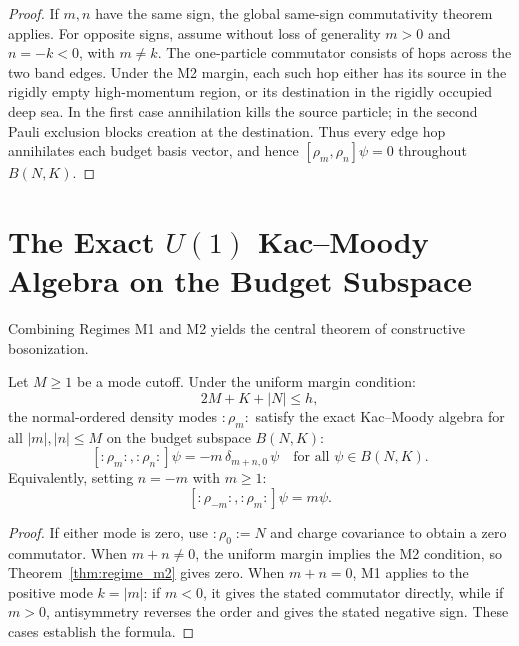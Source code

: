 \begin{proof}
If $m,n$ have the same sign, the global same-sign commutativity theorem applies. For opposite signs, assume without loss of generality $m>0$ and $n=-k<0$, with $m\ne k$. The one-particle commutator consists of hops across the two band edges. Under the M2 margin, each such hop either has its source in the rigidly empty high-momentum region, or its destination in the rigidly occupied deep sea. In the first case annihilation kills the source particle; in the second Pauli exclusion blocks creation at the destination. Thus every edge hop annihilates each budget basis vector, and hence $[\rho_m,\rho_n]\psi=0$ throughout $B(N,K)$.
\end{proof}

\section[The Exact U(1) Kac--Moody Algebra on the Budget Subspace]{The Exact $U(1)$ Kac--Moody Algebra on the Budget Subspace}

Combining Regimes M1 and M2 yields the central theorem of constructive bosonization.

\begin{theorem}
\label{thm:kac_moody}
Let $M \ge 1$ be a mode cutoff. Under the uniform margin condition:
\begin{equation}
2M + K + |N| \le h,
\end{equation}
the normal-ordered density modes $:\!\rho_m\!:$ satisfy the exact Kac--Moody algebra for all $|m|, |n| \le M$ on the budget subspace $B(N, K)$:
\begin{equation}
\left[ :\!\rho_m\!:, :\!\rho_n\!: \right] \psi = -m\, \delta_{m+n, 0}\, \psi \quad \text{for all } \psi \in B(N, K).
\end{equation}
Equivalently, setting $n = -m$ with $m \ge 1$:
\begin{equation}
\left[ :\!\rho_{-m}\!:, :\!\rho_m\!: \right] \psi = m \psi.
\end{equation}
\end{theorem}

\begin{proof}
If either mode is zero, use $:\!\rho_0\!:=N$ and charge covariance to obtain a zero commutator. When $m+n\ne0$, the uniform margin implies the M2 condition, so Theorem~\ref{thm:regime_m2} gives zero. When $m+n=0$, M1 applies to the positive mode $k=|m|$: if $m<0$, it gives the stated commutator directly, while if $m>0$, antisymmetry reverses the order and gives the stated negative sign. These cases establish the formula.
\end{proof}

